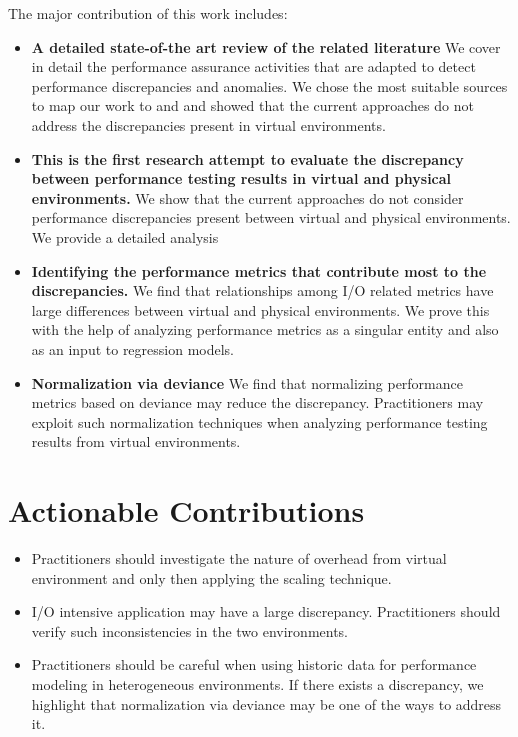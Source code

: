 The major contribution of this work includes: 
\begin{itemize} \itemsep -0.4pt 
	\item \textbf{A detailed state-of-the art review of the related literature} We cover in detail the performance assurance activities that are adapted to detect performance discrepancies and anomalies. We chose the most suitable  sources to map our work to and and showed that the current approaches do not address the discrepancies present in virtual environments.
	
	\item \textbf{This is the first research attempt to evaluate the discrepancy between performance testing results in virtual and physical environments.} We show that the current approaches do not consider performance discrepancies present between virtual and physical environments. We provide a detailed analysis 
	
	\item \textbf{Identifying the performance metrics that contribute most to the discrepancies.} We find that relationships among I/O related metrics have large differences between virtual and physical environments. We prove this with the help of analyzing performance metrics as a singular entity and also as an input to regression models.
	
	\item \textbf{Normalization via deviance} We find that normalizing performance metrics based on deviance may reduce the discrepancy. Practitioners may exploit such normalization techniques when analyzing performance testing results from virtual environments.
\end{itemize}

\section{Actionable Contributions}

\begin{itemize} \itemsep -0.4pt 
	\item Practitioners should investigate the nature of overhead from virtual environment and only then applying the scaling technique.
	
	\item I/O intensive application may have a large discrepancy. Practitioners should verify such inconsistencies in the two environments. 
	
	\item Practitioners should be careful when using historic data for performance modeling in heterogeneous environments. If there exists a discrepancy, we highlight that normalization via deviance may be one of the ways to address it.
	  
\end{itemize}

